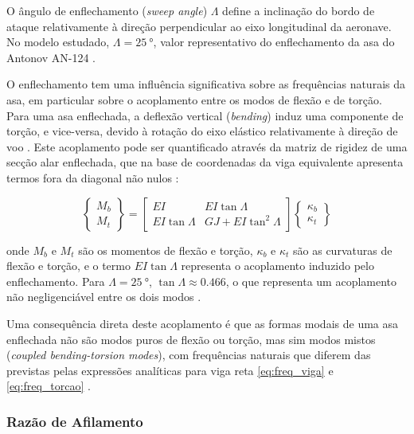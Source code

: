 \documentclass[a4paper,fleqn]{cas-sc}
\begin{document}
O ângulo de enflechamento (\textit{sweep angle}) $\Lambda$ define a inclinação do bordo de ataque relativamente à direção perpendicular ao eixo longitudinal da aeronave. No modelo estudado, $\Lambda = \qty{25}{\degree}$, valor representativo do enflechamento da asa do Antonov AN-124 \cite{Antonov2004}.

O enflechamento tem uma influência significativa sobre as frequências naturais da asa, em particular sobre o acoplamento entre os modos de flexão e de torção. Para uma asa enflechada, a deflexão vertical (\textit{bending}) induz uma componente de torção, e vice-versa, devido à rotação do eixo elástico relativamente à direção de voo \cite{Dowell2004}. Este acoplamento pode ser quantificado através da matriz de rigidez de uma secção alar enflechada, que na base de coordenadas da viga equivalente apresenta termos fora da diagonal não nulos \cite{Hodges2011}:

\begin{equation}
    \begin{Bmatrix} M_b \\ M_t \end{Bmatrix} =
    \begin{bmatrix} 
        EI & EI\tan\Lambda \\ 
        EI\tan\Lambda & GJ + EI\tan^2\Lambda 
    \end{bmatrix}
    \begin{Bmatrix} \kappa_b \\ \kappa_t 
    \end{Bmatrix}
    \label{eq:rigidez_enflechamento}
\end{equation}

\noindent onde $M_b$ e $M_t$ são os momentos de flexão e torção, $\kappa_b$ e $\kappa_t$ são as curvaturas de flexão e torção, e o termo $EI\tan\Lambda$ representa o acoplamento induzido pelo enflechamento. Para $\Lambda = \qty{25}{\degree}$, $\tan\Lambda \approx 0.466$, o que representa um acoplamento não negligenciável entre os dois modos \cite{Bisplinghoff1996}.

Uma consequência direta deste acoplamento é que as formas modais de uma asa enflechada não são modos puros de flexão ou torção, mas sim modos mistos (\textit{coupled bending-torsion modes}), com frequências naturais que diferem das previstas pelas expressões analíticas para viga reta \eqref{eq:freq_viga} e \eqref{eq:freq_torcao} \cite{Wright2015}.

\subsubsection{Razão de Afilamento}
\end{document}
